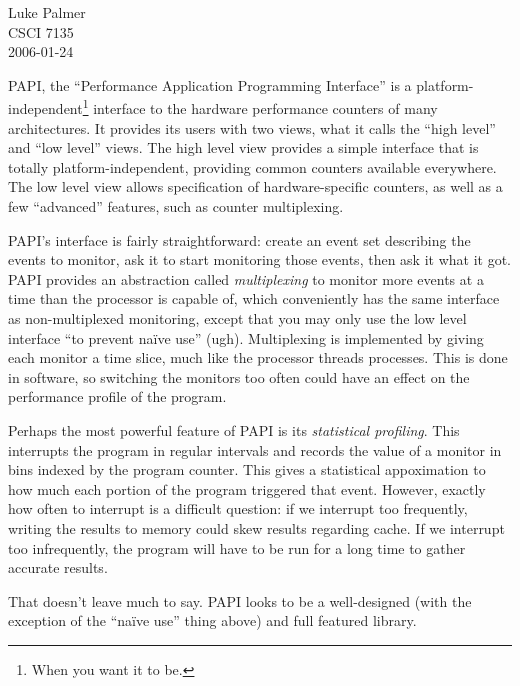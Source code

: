\documentclass[12pt]{article}
\begin{document}
\noindent 
Luke Palmer \\
CSCI 7135 \\
2006-01-24

PAPI, the ``Performance Application Programming Interface'' is a
platform-independent\footnote{When you want it to be.} interface to the
hardware performance counters of many architectures.  It provides its
users with two views, what it calls the ``high level'' and ``low level''
views.   The high level view provides a simple interface that is totally
platform-independent, providing common counters available everywhere.
The low level view allows specification of hardware-specific counters,
as well as a few ``advanced'' features, such as counter multiplexing.

PAPI's interface is fairly straightforward: create an event set
describing the events to monitor, ask it to start monitoring those
events, then ask it what it got.  PAPI provides an abstraction called
\textit{multiplexing} to monitor more events at a time than the
processor is capable of, which conveniently has the same interface as
non-multiplexed monitoring, except that you may only use the low level
interface ``to prevent na\"ive use'' (ugh).  Multiplexing is implemented
by giving each monitor a time slice, much like the processor threads
processes.  This is done in software, so switching the monitors too
often could have an effect on the performance profile of the program.

Perhaps the most powerful feature of PAPI is its \textit{statistical
profiling}.  This interrupts the program in regular intervals and
records the value of a monitor in bins indexed by the program counter.
This gives a statistical appoximation to how much each portion of the
program triggered that event.  However, exactly how often to interrupt
is a difficult question: if we interrupt too frequently, writing the
results to memory could skew results regarding cache.  If we interrupt
too infrequently, the program will have to be run for a long time to
gather accurate results.

That doesn't leave much to say.  PAPI looks to be a well-designed
(with the exception of the ``na\"ive use'' thing above) and full
featured library.
\end{document}
